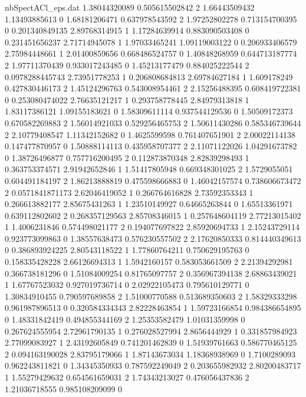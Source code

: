 \begin{filecontents}{nbSpectACl_eps.dat}
1.38044320089 0.505615502842 2
1.66443509432 1.13493885613 0
1.68181206471 0.637978543592 2
1.97252802278 0.713154700395 0
0.201340849135 2.89768314915 1
1.17284639914 0.883090503408 0
0.231451656237 2.71714945078 1
1.97033465241 1.09119003122 0
0.206933406579 2.75984448661 1
2.01400859656 0.668486524757 0
1.40848268959 0.644713187774 2
1.97711370439 0.933017243485 0
1.45213177479 0.884025222544 2
0.0978288445743 2.73951778253 1
0.206808684813 2.69784627184 1
1.609178249 0.427830446173 2
1.45124296763 0.543008954461 2
2.15256488395 0.608419722381 0
0.253080474022 2.76635121217 1
0.293758778445 2.84979313818 1
1.83117386121 1.09155183621 0
1.58309611114 0.937544129536 0
1.50509172373 0.670582269883 2
1.56014921033 0.529256465753 2
1.50611430286 0.585346739644 2
2.10779408547 1.11342152682 0
1.4625599598 0.761407651901 2
2.00022114138 0.147477870957 0
1.50888114113 0.435958707377 2
2.11071122026 1.04291673782 0
1.38726496877 0.757716200495 2
0.112873870348 2.82839298493 1
0.363753374571 2.91942652846 1
1.51417805948 0.669348301025 2
1.5729055051 0.604491184197 2
1.86213888819 0.475598666883 0
1.46042157574 0.738606673472 2
0.0571841871173 2.62046419052 1
0.266764616828 2.73592353343 1
0.266613882177 2.85675431263 1
1.23510149927 0.64665263844 0
1.65513361971 0.639112802602 2
0.268357129563 2.85708346015 1
0.257648604119 2.77213015402 1
1.4006231846 0.574498021177 2
0.194077697822 2.85920694733 1
2.15243729114 0.923773099863 0
1.38557638473 0.576230557502 2
2.17620850333 0.814440349613 0
0.386893924225 2.80543118522 1
1.77860764211 0.750629195763 0
0.158335428228 2.66126694313 1
1.5942160157 0.583053661509 2
2.21394292981 0.366738181296 0
1.51084009254 0.81765097757 2
0.356967394138 2.68863439021 1
1.67767523032 0.927019736714 0
2.02922105473 0.795610129771 0
1.30834910455 0.790597689858 2
1.51000770588 0.513689350603 2
1.58329333298 0.961987896513 0
0.320584334343 2.82228463854 1
1.59723166854 0.984386654895 0
1.48331842419 0.494855344169 2
1.25353582479 1.01031359998 0
0.267624555954 2.72961790135 1
0.276028527994 2.8656444929 1
0.331857984923 2.77099083927 1
2.43192605849 0.741201462839 0
1.51939761663 0.586770465125 2
0.094163190028 2.83795179066 1
1.87143673034 1.18368938969 0
1.7100289093 0.962243811821 0
1.34345350933 0.787592249049 2
0.203655982932 2.80200483717 1
1.55279429632 0.654561659031 2
1.74343213027 0.476056437836 2
1.21036718555 0.985108209099 0
\end{filecontents}
